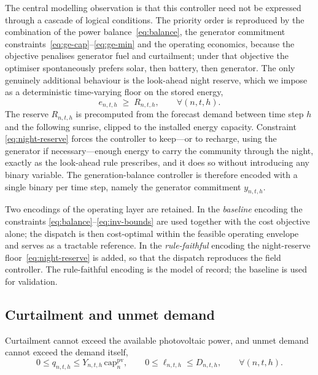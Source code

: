\documentclass[11pt,a4paper]{article}
\theoremstyle{plain}
\theoremstyle{definition}
\begin{document}
The central modelling observation is that this controller need not be expressed through
a cascade of logical conditions. The priority order is reproduced by the combination of
the power balance~\eqref{eq:balance}, the generator commitment
constraints~\eqref{eq:ge-cap}--\eqref{eq:ge-min} and the operating economics, because the
objective penalises generator fuel and curtailment; under that objective the optimiser
spontaneously prefers solar, then battery, then generator. The only genuinely additional
behaviour is the look-ahead night reserve, which we impose as a deterministic
time-varying floor on the stored energy,
\begin{equation}
  e_{n,t,h} \;\geq\; R_{n,t,h},
  \qquad \forall (n,t,h).
  \label{eq:night-reserve}
\end{equation}
The reserve $R_{n,t,h}$ is precomputed from the forecast demand between time step $h$ and
the following sunrise, clipped to the installed energy capacity. Constraint
\eqref{eq:night-reserve} forces the controller to keep---or to recharge, using the
generator if necessary---enough energy to carry the community through the night, exactly
as the look-ahead rule prescribes, and it does so without introducing any binary
variable. The generation-balance controller is therefore encoded with a single binary
per time step, namely the generator commitment $y_{n,t,h}$.

Two encodings of the operating layer are retained. In the \emph{baseline} encoding the
constraints \eqref{eq:balance}--\eqref{eq:inv-bounds} are used together with the cost
objective alone; the dispatch is then cost-optimal within the feasible operating
envelope and serves as a tractable reference. In the \emph{rule-faithful} encoding the
night-reserve floor~\eqref{eq:night-reserve} is added, so that the dispatch reproduces the
field controller. The rule-faithful encoding is the model of record; the baseline is used
for validation.

\subsection{Curtailment and unmet demand}
\label{sec:slacks}

Curtailment cannot exceed the available photovoltaic power, and unmet demand cannot
exceed the demand itself,
\begin{equation}
  0 \leq q_{n,t,h} \leq Y_{n,t,h}\,\mathrm{cap}^{\mathrm{pv}}_n,
  \qquad
  0 \leq \ell_{n,t,h} \leq D_{n,t,h},
  \qquad \forall (n,t,h).
  \label{eq:slacks}
\end{equation}
\end{document}

